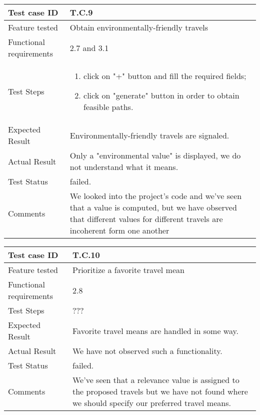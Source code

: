 \begin{table}[H]
	\begin{center}
		\begin{tabular}{ | p{} | p{} | }
		\hline
		Test case ID & T.C.9\\
		\hline
		Feature tested & Obtain environmentally-friendly travels\\
		\hline
		Functional requirements & 2.7 and 3.1\\
		\hline
		Test Steps & 
			\begin{enumerate}
				\item click on "+" button and fill the required fields;
				\item click on "generate" button in order to obtain feasible paths.
			\end{enumerate} \\
		\hline
		Expected Result & Environmentally-friendly travels are signaled.\\
		\hline
		Actual Result & Only a "environmental value" is displayed, we do not understand what it means.\\ 
		\hline
		Test Status & \color{Red}failed.\\ 
		\hline
		Comments & We looked into the project's code and we've seen that a value is computed, but we have observed that different values for different travels are incoherent form one another \\ 
		\hline
		\end{tabular}
	\end{center}
\end{table}

\begin{table}[H]
	\begin{center}
		\begin{tabular}{ | p{} | p{} | }
		\hline
		Test case ID & T.C.10\\
		\hline
		Feature tested & Prioritize a favorite travel mean\\
		\hline
		Functional requirements & 2.8\\
		\hline
		Test Steps & ???\\
		\hline
		Expected Result & Favorite travel means are handled in some way.\\
		\hline
		Actual Result & We have not observed such a functionality.\\ 
		\hline
		Test Status & \color{Red}failed.\\ 
		\hline
		Comments & We've seen that a relevance value is assigned to the proposed travels but we have not found where we should specify our preferred travel means. \\ 
		\hline
		\end{tabular}
	\end{center}
\end{table}

